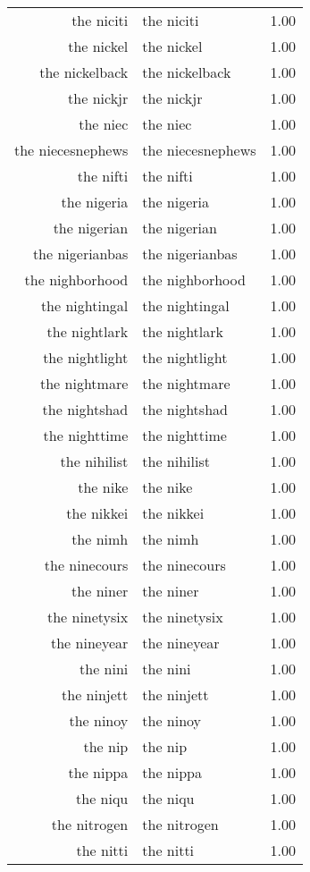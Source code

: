 \begin{table}[ht]
\begin{tabular}{rlr}
  the niciti & the niciti & 1.00 \\ 
  the nickel & the nickel & 1.00 \\ 
  the nickelback & the nickelback & 1.00 \\ 
  the nickjr & the nickjr & 1.00 \\ 
  the niec & the niec & 1.00 \\ 
  the niecesnephews & the niecesnephews & 1.00 \\ 
  the nifti & the nifti & 1.00 \\ 
  the nigeria & the nigeria & 1.00 \\ 
  the nigerian & the nigerian & 1.00 \\ 
  the nigerianbas & the nigerianbas & 1.00 \\ 
  the nighborhood & the nighborhood & 1.00 \\ 
  the nightingal & the nightingal & 1.00 \\ 
  the nightlark & the nightlark & 1.00 \\ 
  the nightlight & the nightlight & 1.00 \\ 
  the nightmare & the nightmare & 1.00 \\ 
  the nightshad & the nightshad & 1.00 \\ 
  the nighttime & the nighttime & 1.00 \\ 
  the nihilist & the nihilist & 1.00 \\ 
  the nike & the nike & 1.00 \\ 
  the nikkei & the nikkei & 1.00 \\ 
  the nimh & the nimh & 1.00 \\ 
  the ninecours & the ninecours & 1.00 \\ 
  the niner & the niner & 1.00 \\ 
  the ninetysix & the ninetysix & 1.00 \\ 
  the nineyear & the nineyear & 1.00 \\ 
  the nini & the nini & 1.00 \\ 
  the ninjett & the ninjett & 1.00 \\ 
  the ninoy & the ninoy & 1.00 \\ 
  the nip & the nip & 1.00 \\ 
  the nippa & the nippa & 1.00 \\ 
  the niqu & the niqu & 1.00 \\ 
  the nitrogen & the nitrogen & 1.00 \\ 
  the nitti & the nitti & 1.00 \\ 

\end{tabular}
\end{table}
